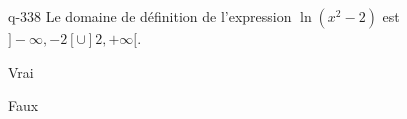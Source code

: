 \begin{truefalse}{q-338}
Le domaine de définition de l'expression $\ln(x^2-2)$ est $]-\infty,-2[\cup ]2,+\infty[$.
\item Vrai
\item* Faux
\end{truefalse}

